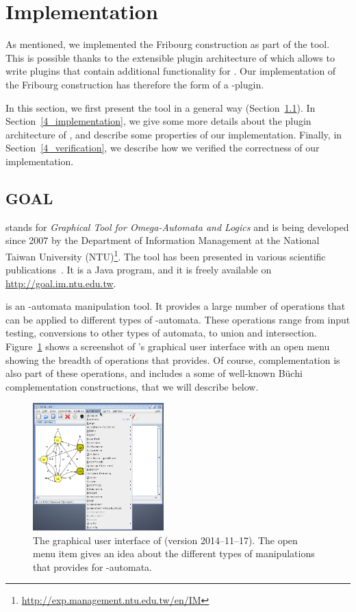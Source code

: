 \section{Implementation}
As mentioned, we implemented the Fribourg construction as part of the \goal{} tool. This is possible thanks to the extensible plugin architecture of \goal{} which allows to write plugins that contain additional functionality for \goal. Our implementation of the Fribourg construction has therefore the form of a \goal-plugin.

In this section, we first present the \goal{} tool in a general way (Section~\ref{4_goal}). In Section~\ref{4_implementation}, we give some more details about the plugin architecture of \goal, and describe some properties of our implementation. Finally, in Section~\ref{4_verification}, we describe how we verified the correctness of our implementation.


\subsection{GOAL}
\label{4_goal}
\goal{} stands for \textit{Graphical Tool for Omega-Automata and Logics} and is being developed since 2007 by the Department of Information Management at the National Taiwan University (NTU)\footnote{\url{http://exp.management.ntu.edu.tw/en/IM}}. The tool has been presented in various scientific publications~\cite{2007_goal}\cite{2008_goal_ext}\cite{2009_goal}\cite{2013_goal}. It is a Java program, and it is freely available on \url{http://goal.im.ntu.edu.tw}.

\goal{} is an \om-automata manipulation tool. It provides a large number of operations that can be applied to different types of \om-automata. These operations range from input testing, conversions to other types of automata, to union and intersection. Figure~\ref{goal_gui} shows a screenshot of \goal's graphical user interface with an open menu showing the breadth of operations that \goal{} provides. Of course, complementation is also part of these operations, and \goal{} includes a some of well-known Büchi complementation constructions, that we will describe below.

\begin{figure}[htb!]
\centering
\includegraphics[width=0.45\textwidth]{figures/goal.png}
\caption{The graphical user interface of \goal{} (version 2014--11--17). The open menu item gives an idea about the different types of manipulations that \goal{} provides for \om-automata.}
\label{goal_gui}
\end{figure}

